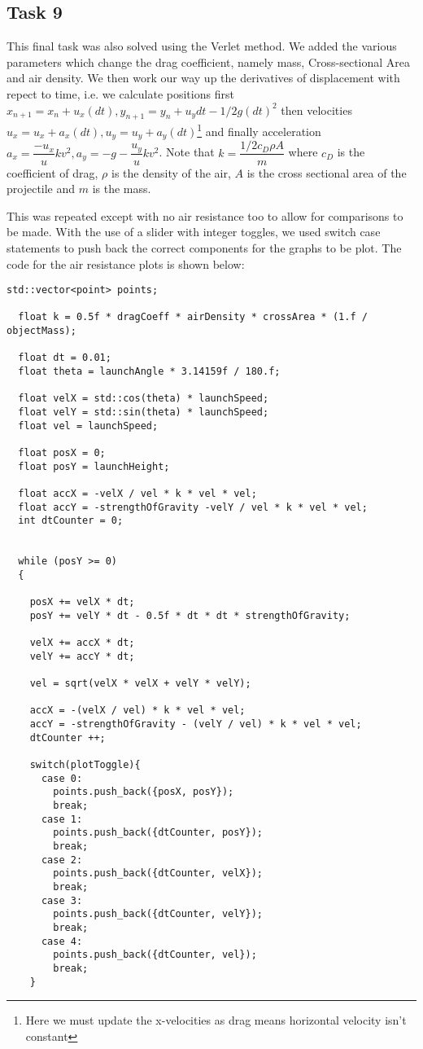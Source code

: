 \documentclass[main.tex]{subfiles}
\begin{document}
\subsection{Task 9}
This final task was also solved using the Verlet method. We added the various parameters which change the drag coefficient, namely mass, Cross-sectional Area and air density. We then work our way up the derivatives of displacement with repect to time, i.e. we calculate positions first $x_{n+1} = x_n + u_x  (dt), y_{n+1} = y_n + u_y dt - 1/2g (dt)^2$ then velocities $u_x = u_x + a_x (dt), u_y = u_y + a_y (dt)$\footnote{Here we must update the x-velocities as drag means horizontal velocity isn't constant} and finally acceleration $a_x = \dfrac{-u_x}{u}kv^2, a_y = -g-\dfrac{u_y}{u}kv^2$. Note that $k = \dfrac{1/2 c_D \rho A}{m}$ where $c_D$ is the coefficient of drag, $\rho$ is the density of the air, $A$ is the cross sectional area of the projectile and $m$ is the mass.

\noindent This was repeated except with no air resistance too to allow for comparisons to be made. With the use of a slider with integer toggles, we used switch case statements to push back the correct components for the graphs to be plot. The code for the air resistance plots is shown below:

\begin{lstlisting}
std::vector<point> points;

  float k = 0.5f * dragCoeff * airDensity * crossArea * (1.f / objectMass);

  float dt = 0.01;
  float theta = launchAngle * 3.14159f / 180.f;

  float velX = std::cos(theta) * launchSpeed;
  float velY = std::sin(theta) * launchSpeed;
  float vel = launchSpeed;

  float posX = 0;
  float posY = launchHeight;

  float accX = -velX / vel * k * vel * vel;
  float accY = -strengthOfGravity -velY / vel * k * vel * vel;
  int dtCounter = 0;


  while (posY >= 0)
  {

    posX += velX * dt;
    posY += velY * dt - 0.5f * dt * dt * strengthOfGravity;

    velX += accX * dt;
    velY += accY * dt;

    vel = sqrt(velX * velX + velY * velY);

    accX = -(velX / vel) * k * vel * vel;
    accY = -strengthOfGravity - (velY / vel) * k * vel * vel;
    dtCounter ++;

    switch(plotToggle){
      case 0:
        points.push_back({posX, posY});
        break;
      case 1:
        points.push_back({dtCounter, posY});
        break;
      case 2:
        points.push_back({dtCounter, velX});
        break;
      case 3:
        points.push_back({dtCounter, velY});
        break;
      case 4:
        points.push_back({dtCounter, vel});
        break;
    }
\end{lstlisting}
\end{document}
